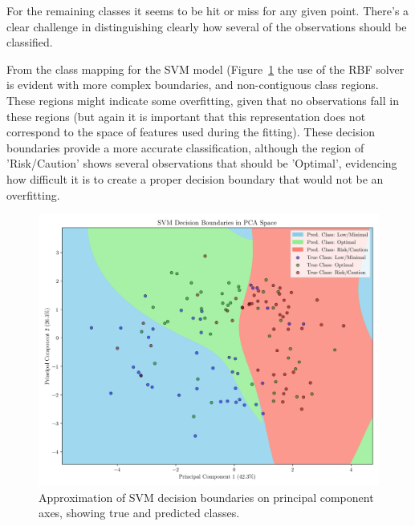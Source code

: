 \documentclass[conference]{IEEEtran}
\begin{document}
For the remaining classes it seems to be hit or miss for any given point. There's a clear challenge in distinguishing clearly how several of the observations should be classified. 

From the class mapping for the SVM model (Figure~\ref{pca_svm} the use of the RBF solver is evident with more complex boundaries, and non-contiguous class regions. These regions might indicate some overfitting, given that no observations fall in these regions (but again it is important that this representation does not correspond to the space of features used during the fitting). These decision boundaries provide a more accurate classification, although the region of 'Risk/Caution' shows several observations that should be 'Optimal', evidencing how difficult it is to create a proper decision boundary that would not be an overfitting.

\begin{figure}[H]
    \centering
    \includegraphics[width=1\linewidth]{assets/pca_svm.png}
    \caption{Approximation of SVM decision boundaries on principal component axes, showing true and predicted classes.}
    \label{pca_svm}
\end{figure} %
\end{document}
